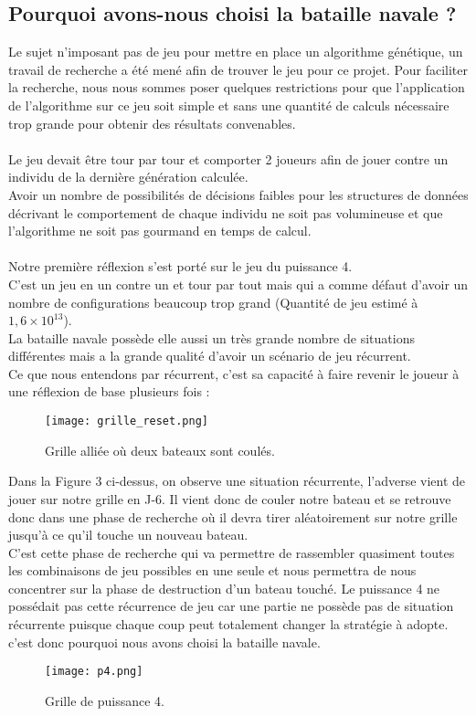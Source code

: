 \documentclass[12pt]{report}
\begin{document}
	\subsection{Pourquoi avons-nous choisi la bataille navale ?}
	Le sujet n'imposant pas de jeu pour mettre en place un algorithme génétique, un travail de recherche a été mené afin de trouver le jeu pour ce projet. Pour faciliter la recherche, nous nous sommes poser quelques restrictions pour que l'application de l'algorithme sur ce jeu soit simple et sans une quantité de calculs nécessaire trop grande pour obtenir des résultats convenables.\\\\
	Le jeu devait être tour par tour et comporter 2 joueurs afin de jouer contre un individu de la dernière génération calculée.\\
	Avoir un nombre de possibilités de décisions faibles pour les structures de données décrivant le comportement de chaque individu ne soit pas volumineuse et que l'algorithme ne soit pas gourmand en temps de calcul.\\\\
	Notre première réflexion s'est porté sur le jeu du puissance 4.\\
	C'est un jeu en un contre un et tour par tout mais qui a comme défaut d'avoir un nombre de configurations beaucoup trop grand (Quantité de jeu estimé à $1,6 \times 10^{13}$).\\
	La bataille navale possède elle aussi un très grande nombre de situations différentes mais a la grande qualité d'avoir un scénario de jeu récurrent.\\
	Ce que nous entendons par récurrent, c'est sa capacité à faire revenir le joueur à une réflexion de base plusieurs fois :\\
	\begin{figure}[h]
    	\begin{center}
		\texttt{[image: grille\_reset.png]}
		\caption{Grille alliée où deux bateaux sont coulés.}
		\end{center}
	\end{figure}
	\newpage
	Dans la Figure 3 ci-dessus, on observe une situation récurrente, l'adverse vient de jouer sur notre grille en J-6. Il vient donc de couler notre bateau et se retrouve donc dans une phase de recherche où il devra tirer aléatoirement sur notre grille jusqu'à ce qu'il touche un nouveau bateau.\\
	C'est cette phase de recherche qui va permettre de rassembler quasiment toutes les combinaisons de jeu possibles en une seule et nous permettra de nous concentrer sur la phase de destruction d'un bateau touché. Le puissance 4 ne possédait pas cette récurrence de jeu car une partie ne possède pas de situation récurrente puisque chaque coup peut totalement changer la stratégie à adopte. c'est donc pourquoi nous avons choisi la bataille navale.\\
	\begin{figure}[h]
    	\begin{center}
		\texttt{[image: p4.png]}
		\caption{Grille de puissance 4.}
		\end{center}
	\end{figure}
	
\end{document}
